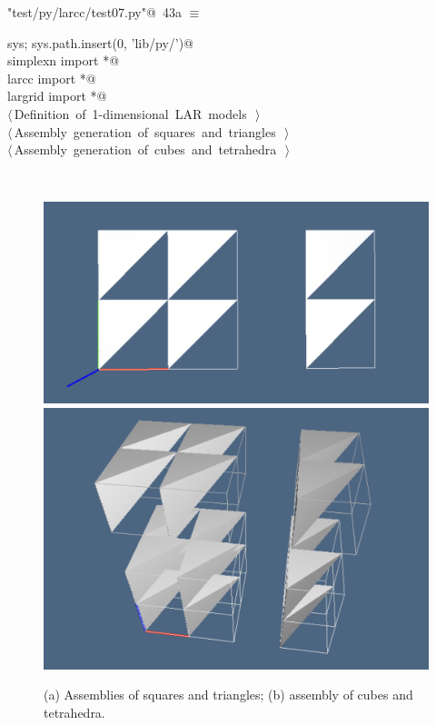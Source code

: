 \documentclass[11pt,oneside]{article}	%
\begin{document}
\begin{flushleft} \small
\begin{minipage}{\linewidth} \label{scrap92}
\protect{}\verb@"test/py/larcc/test07.py"@\nobreak\ {\footnotesize 43a }$\equiv$
\vspace{-1ex}
\begin{list}{}{} \item
\mbox{}\verb@import sys; sys.path.insert(0, 'lib/py/')@\\
\mbox{}\verb@from simplexn import *@\\
\mbox{}\verb@from larcc import *@\\
\mbox{}\verb@from largrid import *@\\
\mbox{}\verb@@\hbox{$\langle\,$Definition of 1-dimensional LAR models\nobreak\ {\footnotesize {}}$\,\rangle$}\verb@@\\
\mbox{}\verb@@\hbox{$\langle\,$Assembly generation of squares and triangles\nobreak\ {\footnotesize {}}$\,\rangle$}\verb@@\\
\mbox{}\verb@@\hbox{$\langle\,$Assembly generation of cubes and tetrahedra\nobreak\ {\footnotesize {}}$\,\rangle$}\verb@@\\
\mbox{}\verb@@{\NWsep}
\end{list}
\vspace{-2ex}
\end{minipage}\\[4ex]
\end{flushleft}

\begin{figure}[htbp] %
   \centering
   \includegraphics[width=0.405\linewidth]{images/assembly1} 
   \includegraphics[width=0.315\linewidth]{images/assembly2} 
   \caption{(a) Assemblies of squares and triangles; (b) assembly of cubes and tetrahedra.}
   \label{fig:example}
\end{figure}
\end{document}
